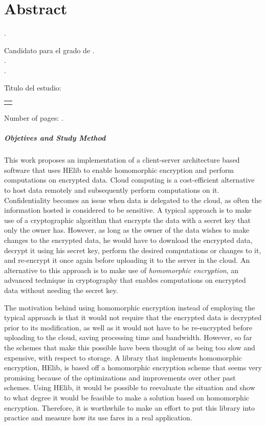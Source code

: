 \chapter{Abstract}

\noindent\autor.

\noindent Candidato para el grado de \grado. \\
\noindent\uanl.\\
\noindent\fime.

\noindent T\'{\i}tulo del estudio: 
\begin{center}
\begin{tabular}{p{13cm}}
	\centering
	\scshape{\large{\titulo}}
\end{tabular}
\end{center} %

\noindent Number of pages: \pageref{LastPage}.

\paragraph{Objetives and Study Method}
This work proposes an implementation of a client-server architecture based software that uses HElib to enable homomorphic encryption and perform computations on encrypted data. Cloud computing is a cost-efficient alternative to host data remotely and subsequently perform computations on it. Confidentiality becomes an issue when data is delegated to the cloud, as often the information hosted is considered to be sensitive. A typical approach is to make use of a cryptographic algorithm that encrypts the data with a secret key that only the owner has. However, as long as the owner of the data wishes to make changes to the encrypted data, he would have to download the encrypted data, decrypt it using his secret key, perform the desired computations or changes to it, and re-encrypt it once again before uploading it to the server in the cloud. An alternative to this approach is to make use of \emph{homomorphic encryption}, an advanced technique in cryptography that enables computations on encrypted data without needing the secret key.

The motivation behind using homomorphic encryption instead of employing the typical approach is that it would not require that the encrypted data is decrypted prior to its modification, as well as it would not have to be re-encrypted before uploading to the cloud, saving processing time and bandwidth. However, so far the schemes that make this possible have been thought of as being too slow and expensive, with respect to storage. A library that implements homomorphic encryption, HElib, is based off a homomorphic encryption scheme that seems very promising because of the optimizations and improvements over other past schemes. Using HElib, it would be possible to reevaluate the situation and show to what degree it would be feasible to make a solution based on homomorphic encryption. Therefore, it is worthwhile to make an effort to put this library into practice and measure how its use fares in a real application.

